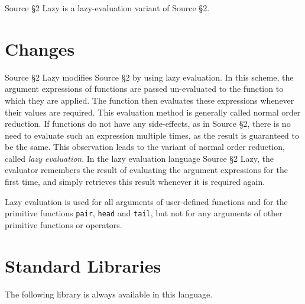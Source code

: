 





Source \S 2 Lazy is a lazy-evaluation variant of Source \S 2.

\section{Changes}

Source \S 2 Lazy modifies Source \S 2 by using
lazy evaluation. In
this scheme, the argument expressions of functions are passed un-evaluated
to the function to which they are applied. The function then evaluates
these expressions whenever their values are required. This evaluation
method is generally
called normal order reduction. If functions
do not have any side-effects, as in Source \S 2,
there is no need to evaluate such an expression
multiple times, as the result is guaranteed to be the same. This observation
leads to the variant of normal order reduction, called \emph{lazy evaluation}.
In the lazy evaluation language Source \S 2 Lazy,
the evaluator remembers the result of evaluating the
argument expressions for the first time, and simply retrieves this result
whenever it is required again.

Lazy evaluation is used for all arguments of user-defined functions and
for the primitive functions \lstinline{pair}, \lstinline{head} and
\lstinline{tail}, but
not for any arguments of other primitive functions or operators.

\newpage





















\section{Standard Libraries}

The following library is always available in this language.







\newpage



    
